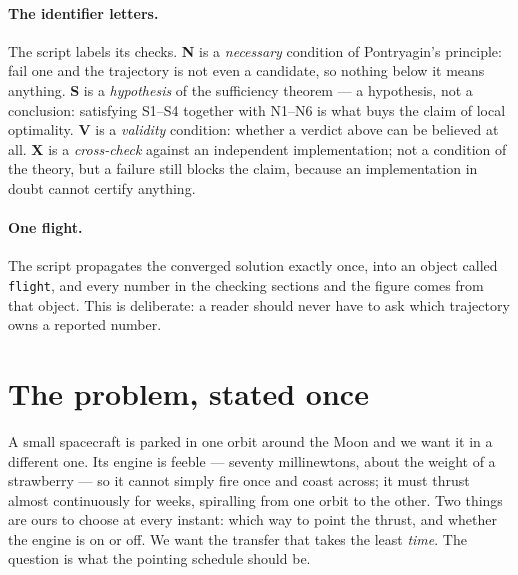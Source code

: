 \documentclass[11pt]{article}
\newcommand{\code}[1]{\texttt{#1}}
\begin{document}
\paragraph{The identifier letters.} The script labels its checks. \textbf{N}
is a \emph{necessary} condition of Pontryagin's principle: fail one and the
trajectory is not even a candidate, so nothing below it means anything.
\textbf{S} is a \emph{hypothesis} of the sufficiency theorem --- a hypothesis,
not a conclusion: satisfying S1--S4 together with N1--N6 is what buys the claim
of local optimality. \textbf{V} is a \emph{validity} condition: whether a
verdict above can be believed at all. \textbf{X} is a \emph{cross-check}
against an independent implementation; not a condition of the theory, but a
failure still blocks the claim, because an implementation in doubt cannot
certify anything.

\paragraph{One flight.} The script propagates the converged solution exactly
once, into an object called \code{flight}, and every number in the checking
sections and the figure comes from that object. This is deliberate: a reader
should never have to ask which trajectory owns a reported number.

\section{The problem, stated once}\label{sec:ocp}

\begin{eli}
A small spacecraft is parked in one orbit around the Moon and we want it in a
different one. Its engine is feeble --- seventy millinewtons, about the weight
of a strawberry --- so it cannot simply fire once and coast across; it must
thrust almost continuously for weeks, spiralling from one orbit to the other.
Two things are ours to choose at every instant: which way to point the thrust,
and whether the engine is on or off. We want the transfer that takes the least
\emph{time}. The question is what the pointing schedule should be.
\end{eli}
\end{document}
